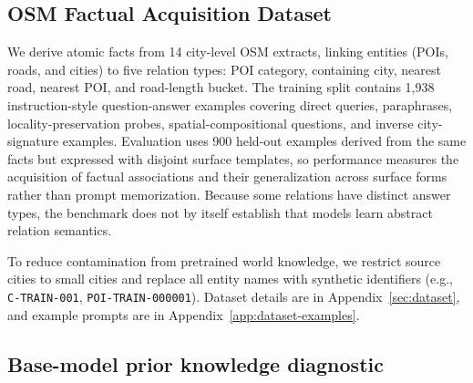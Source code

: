 \documentclass[11pt]{article}
\begin{document}
\subsection{OSM Factual Acquisition Dataset}
\label{sec:short-osm}

We derive atomic facts from 14 city-level OSM extracts, linking entities
(POIs, roads, and cities) to five relation types: POI category, containing city,
nearest road, nearest POI, and road-length bucket. The training split contains
1,938 instruction-style question-answer examples covering direct queries,
paraphrases, locality-preservation probes, spatial-compositional questions, and
inverse city-signature examples. Evaluation uses 900 held-out examples derived
from the same facts but expressed with disjoint surface templates, so performance
measures the acquisition of 
factual associations and their
generalization across surface forms rather than prompt memorization. Because some
relations have distinct answer types, the benchmark does not by itself establish
that models learn abstract relation semantics.

To reduce contamination from pretrained world knowledge, we restrict source
cities to small cities and replace all entity names with synthetic identifiers
(e.g., \texttt{C-TRAIN-001}, \texttt{POI-TRAIN-000001}). Dataset details are in
Appendix~\ref{sec:dataset}, and example prompts are in
Appendix~\ref{app:dataset-examples}.


\subsection{Base-model prior knowledge diagnostic}
\end{document}
